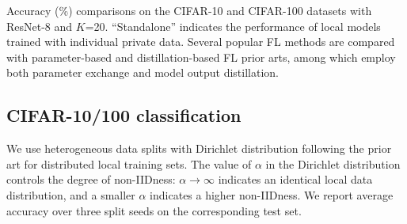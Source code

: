 \documentclass[letterpaper]{article} %
\begin{document}
\begin{table}[]
{}
\caption{Accuracy (\%) comparisons on the CIFAR-10 and CIFAR-100 datasets with ResNet-8 and $K$=20. ``Standalone'' indicates the performance of local models trained with individual private data. Several popular FL methods are compared with parameter-based and distillation-based FL prior arts, among which \cite{lin2020ensemble, zhu2021data} employ both parameter exchange and model output distillation.}
\label{tab:cifarcompare}
\end{table}



\subsection{CIFAR-10/100 classification}
We use heterogeneous data splits with Dirichlet distribution following the prior art \cite{hsu2019measuring} for distributed local training sets. The value of $\alpha$ in the Dirichlet distribution controls the degree of non-IIDness: $\alpha \rightarrow \infty$ indicates an identical local data distribution, and a smaller $\alpha$ indicates a higher non-IIDness. We report average accuracy over three split seeds on the corresponding test set.
\end{document}
